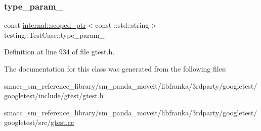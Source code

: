 \subsubsection{\texorpdfstring{type\+\_\+param\+\_\+}{type\_param\_}}
{\footnotesize\ttfamily const \hyperlink{classtesting_1_1internal_1_1scoped__ptr}{internal\+::scoped\+\_\+ptr}$<$const \+::std\+::string$>$ testing\+::\+Test\+Case\+::type\+\_\+param\+\_\+\hspace{0.3cm}{\ttfamily [private]}}



Definition at line 934 of file gtest.\+h.



The documentation for this class was generated from the following files\+:\begin{DoxyCompactItemize}
\item 
smacc\+\_\+sm\+\_\+reference\+\_\+library/sm\+\_\+panda\+\_\+moveit/libfranka/3rdparty/googletest/googletest/include/gtest/\hyperlink{gtest_8h}{gtest.\+h}\item 
smacc\+\_\+sm\+\_\+reference\+\_\+library/sm\+\_\+panda\+\_\+moveit/libfranka/3rdparty/googletest/googletest/src/\hyperlink{gtest_8cc}{gtest.\+cc}\end{DoxyCompactItemize}
